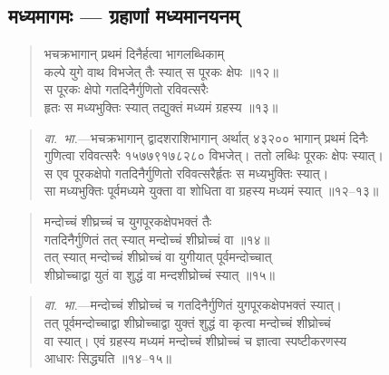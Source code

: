 \documentclass[11pt,a4paper]{article}
\newcommand{\dev}[1]{{\devanagarifont #1}}
\newenvironment{shloka}{%
  \begin{quote}
  \small
  \setlength{\leftmargin}{2em}
  \devanagarifont
}{\end{quote}}
\newenvironment{vyakhya}{%
  \begin{quote}
  \small
  \setlength{\leftmargin}{1em}
  \devanagarifont
}{\end{quote}}
\newcommand{\skt}[1]{{\devanagarifont #1}}
\begin{document}
\subsection{\dev{मध्यमागमः — ग्रहाणां मध्यमानयनम्}}

\begin{shloka}
\skt{भचक्रभागान् प्रथमं दिनैर्हत्वा भागलब्धिकाम्}\\[0.3em]
\skt{कल्पे युगे वाथ विभजेत् तैः स्यात् स पूरकः क्षेपः ॥१२॥}\\[0.3em]
\skt{स पूरकः क्षेपो गतदिनैर्गुणितो रविवत्सरैः}\\[0.3em]
\skt{हृतः स मध्यभुक्तिः स्यात् तद्युक्तं मध्यमं ग्रहस्य ॥१३॥}
\end{shloka}

\begin{vyakhya}
\textit{वा.~भा.}—\skt{भचक्रभागान् द्वादशराशिभागान् अर्थात् ४३२०० भागान् प्रथमं दिनैः}\\
\skt{गुणित्वा रविवत्सरैः १५७७९१७८२८० विभजेत्। ततो लब्धिः पूरकः क्षेपः स्यात्।}\\
\skt{स एव पूरकक्षेपो गतदिनैर्गुणितो रविवत्सरैर्हृतः स मध्यभुक्तिः स्यात्।}\\
\skt{सा मध्यभुक्तिः पूर्वमध्यमे युक्ता वा शोधिता वा ग्रहस्य मध्यमं स्यात् ॥१२--१३॥}
\end{vyakhya}

\begin{shloka}
\skt{मन्दोच्चं शीघ्रच्चं च युगपूरकक्षेपभक्तं तैः}\\[0.3em]
\skt{गतदिनैर्गुणितं तत् स्यात् मन्दोच्चं शीघ्रोच्चं वा ॥१४॥}\\[0.3em]
\skt{तत् स्यात् मन्दोच्चं शीघ्रोच्चं वा युगीयात् पूर्वमन्दोच्चात्}\\[0.3em]
\skt{शीघ्रोच्चाद्वा युतं वा शुद्धं वा मन्दशीघ्रोच्चं स्यात् ॥१५॥}
\end{shloka}

\begin{vyakhya}
\textit{वा.~भा.}—\skt{मन्दोच्चं शीघ्रोच्चं च गतदिनैर्गुणितं युगपूरकक्षेपभक्तं स्यात्।}\\
\skt{तत् पूर्वमन्दोच्चाद्वा शीघ्रोच्चाद्वा युक्तं शुद्धं वा कृत्वा मन्दोच्चं शीघ्रोच्चं}\\
\skt{वा स्यात्। एवं ग्रहस्य मध्यमं मन्दोच्चं शीघ्रोच्चं च ज्ञात्वा स्पष्टीकरणस्य}\\
\skt{आधारः सिद्ध्यति ॥१४--१५॥}
\end{vyakhya}
\end{document}
